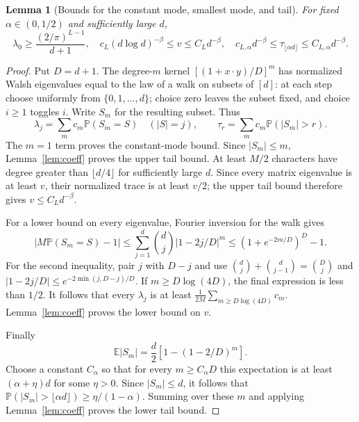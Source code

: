 \documentclass[11pt]{article}
\newtheorem{lemma}[theorem]{Lemma}
\newcommand{\E}{\mathbb E}
\newcommand{\Pp}{\mathbb P}
\begin{document}
\begin{lemma}[Bounds for the constant mode, smallest mode, and tail]\label{lem:spectrum}
For fixed $\alpha\in(0,1/2)$ and sufficiently large $d$,
\[
 \lambda_0\ge\frac{(2/\pi)^{L-1}}{d+1},\quad
 c_L(d\log d)^{-\beta}\le v\le C_L d^{-\beta},\quad
 c_{L,\alpha}d^{-\beta}\le\tau_{\lfloor\alpha d\rfloor}
 \le C_{L,\alpha}d^{-\beta}.
\]
\end{lemma}
\begin{proof}
Put $D=d+1$. The degree-$m$ kernel $[(1+x\cdot y)/D]^m$ has normalized Walsh eigenvalues equal to the law of a walk on subsets of $[d]$: at each step choose uniformly from $\{0,1,\dots,d\}$; choice zero leaves the subset fixed, and choice $i\ge1$ toggles $i$. Write $S_m$ for the resulting subset. Thus
\[
 \lambda_j=\sum_m c_m\Pp(S_m=S)\quad(|S|=j),
 \qquad \tau_r=\sum_m c_m\Pp(|S_m|>r).
\]
The $m=1$ term proves the constant-mode bound. Since $|S_m|\le m$, Lemma~\ref{lem:coeff} proves the upper tail bound.
At least $M/2$ characters have degree greater than $\lfloor d/4\rfloor$ for sufficiently large $d$. Since every matrix eigenvalue is at least $v$, their normalized trace is at least $v/2$; the upper tail bound therefore gives $v\le C_L d^{-\beta}$.

For a lower bound on every eigenvalue, Fourier inversion for the walk gives
\[
 \left|M\Pp(S_m=S)-1\right|
 \le\sum_{j=1}^d\binom dj|1-2j/D|^m
 \le(1+e^{-2m/D})^D-1.
\]
For the second inequality, pair $j$ with $D-j$ and use
$\binom dj+\binom d{j-1}=\binom Dj$ and
$|1-2j/D|\le e^{-2\min(j,D-j)/D}$.
If $m\ge D\log(4D)$, the final expression is less than $1/2$.
It follows that every $\lambda_j$ is at least
$\tfrac1{2M}\sum_{m\ge D\log(4D)}c_m$.
Lemma~\ref{lem:coeff} proves the lower bound on $v$.

Finally
\[
 \E|S_m|=\frac d2\left[1-(1-2/D)^m\right].
\]
Choose a constant $C_\alpha$ so that for every $m\ge C_\alpha D$ this expectation is at least $(\alpha+\eta)d$ for some $\eta>0$.
Since $|S_m|\le d$, it follows that
$\Pp(|S_m|>\lfloor\alpha d\rfloor)\ge\eta/(1-\alpha)$.
Summing over these $m$ and applying Lemma~\ref{lem:coeff} proves the lower tail bound.
\end{proof}
\end{document}
